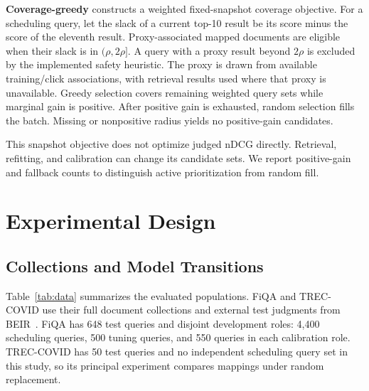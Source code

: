 \documentclass[runningheads]{llncs}
\begin{document}
\textbf{Coverage-greedy} constructs a weighted fixed-snapshot coverage objective. For a scheduling query, let the slack of a current top-10 result be its score minus the score of the eleventh result. Proxy-associated mapped documents are eligible when their slack is in $(\rho,2\rho]$. A query with a proxy result beyond $2\rho$ is excluded by the implemented safety heuristic. The proxy is drawn from available training/click associations, with retrieval results used where that proxy is unavailable. Greedy selection covers remaining weighted query sets while marginal gain is positive. After positive gain is exhausted, random selection fills the batch. Missing or nonpositive radius yields no positive-gain candidates.

This snapshot objective does not optimize judged nDCG directly. Retrieval, refitting, and calibration can change its candidate sets. We report positive-gain and fallback counts to distinguish active prioritization from random fill.

\section{Experimental Design}

\subsection{Collections and Model Transitions}

Table~\ref{tab:data} summarizes the evaluated populations. FiQA and TREC-COVID use their full document collections and external test judgments from BEIR~\cite{beir}. FiQA has 648 test queries and disjoint development roles: 4,400 scheduling queries, 500 tuning queries, and 550 queries in each calibration role. TREC-COVID has 50 test queries and no independent scheduling query set in this study, so its principal experiment compares mappings under random replacement.
\end{document}
